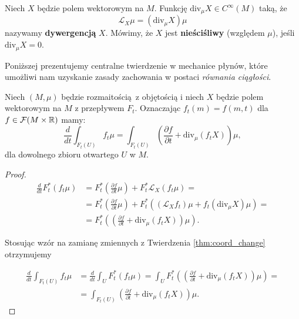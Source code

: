 Niech \(X\) będzie polem wektorowym na \(M\). Funkcję \(\mathrm{div}_\mu X \in C^\infty(M)\) taką, że 
\begin{equation}
\mathcal{L}_X \mu = (\mathrm{div}_\mu X) \mu
\end{equation}
nazywamy \textbf{dywergencją} \(X\). Mówimy, że \(X\) jest \textbf{nieściśliwy} (względem \(\mu\)), jeśli \(\mathrm{div}_\mu X = 0\).

Poniższej prezentujemy centralne twierdzenie w mechanice płynów, które umożliwi nam uzyskanie zasady zachowania w postaci \emph{równania ciągłości}.
\begin{twierdzenie}\label{thm:transport}
    Niech \((M, \mu)\) będzie rozmaitością z objętością i niech \(X\) będzie polem wektorowym na \(M\) z przepływem \(F_t\). Oznaczając \(f_t(m) = f(m, t)\) dla \(f\in\mathcal{F}(M\times \mathbb{R})\) mamy:
\begin{equation}\label{eq:transport}
    \frac{d}{dt}\int_{F_t(U)} f_t \mu = \int_{F_t(U)}\left(\frac{\partial f}{\partial t} + \mathrm{div}_\mu (f_t X)\right) \mu,
\end{equation}
    dla dowolnego zbioru otwartego \(U\) w \(M\).
\end{twierdzenie}
\begin{proof}
    \begin{align*}
        \frac{d}{dt}F^\ast_t(f_t\mu) &= F^\ast_t\left(\frac{\partial f}{\partial t}\mu\right)+
        F^\ast_t\mathcal{L}_X(f_t\mu) =\\
        &= F^\ast_t\left(\frac{\partial f}{\partial t}\mu\right) +
        F^\ast_t\left(\left(\mathcal{L}_X f_t\right)\mu + f_t(\mathrm{div}_\mu X)\mu\right) =\\
        &= F^\ast_t\left(\left(\frac{\partial f}{\partial t}+\mathrm{div}_\mu(f_t X)\right)\mu\right). 
    \end{align*}

    Stosując wzór na zamianę zmiennych z Twierdzenia \ref{thm:coord_change} otrzymujemy

    \begin{align*}
       \frac{d}{dt}\int_{F_t (U)} f_t \mu &= \frac{d}{dt}\int_U F^\ast_t (f_t \mu) 
       = \int_U F^\ast_t \left(\left(\frac{\partial f}{\partial t} + \mathrm{div}_\mu (f_t X)\right)\mu\right) =\\
       &=\int_{F_t(U)} \left(\frac{\partial f}{\partial t} + \mathrm{div}_\mu (f_t X)\right)\mu.
    \end{align*}
\end{proof}
